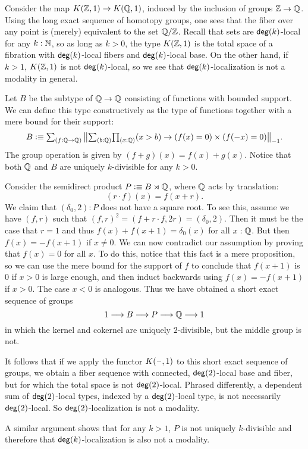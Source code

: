 \begin{eg}\label{example:nonlocalfib2}
    Consider the map $K(\mathbb{Z},1) \to K(\mathbb{Q},1)$, induced by the inclusion of groups $\mathbb{Z} \to \mathbb{Q}$.
    Using the long exact sequence of homotopy groups, one sees that the fiber over any point is
    (merely) equivalent to the set $\mathbb{Q}/\mathbb{Z}$. Recall that sets are $\mathsf{deg}(k)$-local for any $k : \mathbb{N}$,
    so as long as $k > 0$, the type $K(\mathbb{Z},1)$ is the total space of a fibration with $\mathsf{deg}(k)$-local fibers and $\mathsf{deg}(k)$-local base.
    On the other hand, if $k > 1$, $K(\mathbb{Z},1)$ is not $\mathsf{deg}(k)$-local, so we see that $\mathsf{deg}(k)$-localization
    is not a modality in general.
\end{eg}

\begin{eg}\label{example:nonlocalfib}
    Let $B$ be the subtype of $\mathbb{Q} \to \mathbb{Q}$ consisting of functions with bounded support.
    We can define this type constructively as the type of functions together with
    a mere bound for their support:
    \[
         B \defeq \sm{f : \Q \to \Q} \, \ttrunc{-1}{\sm{b : \Q} \prd{x : \Q} (x > b) \to (f(x) = 0) \times (f(-x) = 0)}.
    \]
    The group operation is given by $(f + g)(x) = f(x) + g(x)$.
    Notice that both $\mathbb{Q}$ and $B$ are uniquely $k$-divisible for any $k > 0$.

    Consider the semidirect product $P \vcentcolon\equiv B \rtimes \mathbb{Q}$, where $\mathbb{Q}$ acts by translation:
    \[
        (r \cdot f)(x) = f(x+r).
    \]
    We claim that $(\delta_0, 2) : P$ does not have a square root. To see
    this, assume we have $(f,r)$ such that $(f,r)^2 = (f + r\cdot f,2r) = (\delta_0, 2)$.
    Then it must be the case that $r = 1$ and thus $f(x) + f(x+1) = \delta_0(x)$ for all $x : \mathbb{Q}$.
    But then $f(x) = - f(x+1)$ if $x \neq 0$.
    We can now contradict our assumption by proving that $f(x) = 0$ for all $x$.
    To do this, notice that this fact is a mere proposition, so we
    can use the mere bound for the support of $f$ to conclude that $f(x+1)$ is $0$ if $x>0$ is large enough,
    and then induct backwards using $f(x) = - f(x+1)$ if $x>0$. The case $x<0$ is analogous.
    Thus we have obtained a short exact sequence of groups
    \[
        1 \longrightarrow B \longrightarrow P \longrightarrow \mathbb{Q} \longrightarrow 1
    \]
    in which the kernel and cokernel are uniquely $2$-divisible, but the middle group is not.

    It follows that if we apply the functor $K(\mathord{\hspace{1pt}\text{--}\hspace{1pt}}, 1)$ to this short exact sequence of groups,
    we obtain a fiber sequence with connected, $\mathsf{deg}(2)$-local base and fiber,
    but for which the total space is not $\mathsf{deg}(2)$-local.
    Phrased differently, a dependent sum of $\mathsf{deg}(2)$-local types, indexed by 
    a $\mathsf{deg}(2)$-local type, is not necessarily $\mathsf{deg}(2)$-local.
    So $\mathsf{deg}(2)$-localization is not a modality.

    A similar argument shows that for any $k > 1$, $P$ is not uniquely $k$-divisible
    and therefore that $\mathsf{deg}(k)$-localization is also not a modality.
\end{eg}


